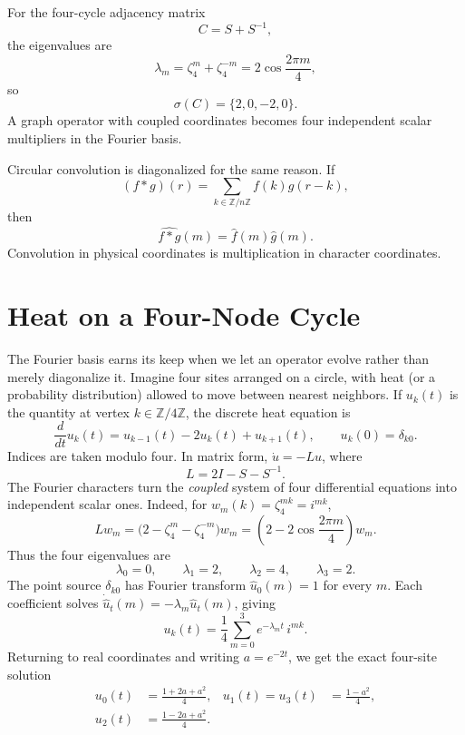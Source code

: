 For the four-cycle adjacency matrix
\[
  C=S+S^{-1},
\]
the eigenvalues are
\[
  \lambda_m
  =\zeta_4^m+\zeta_4^{-m}
  =2\cos\frac{2\pi m}{4},
\]
so
\[
  \sigma(C)=\{2,0,-2,0\}.
\]
A graph operator with coupled coordinates becomes four independent scalar multipliers in the Fourier basis.

Circular convolution is diagonalized for the same reason.  If
\[
  (f*g)(r)=
  \sum_{k\in\mathbb Z/n\mathbb Z}
  f(k)g(r-k),
\]
then
\[
  \widehat{f*g}(m)
  =\widehat f(m)\widehat g(m).
\]
Convolution in physical coordinates is multiplication in character coordinates.

\section{Heat on a Four-Node Cycle}

The Fourier basis earns its keep when we let an operator evolve rather than merely diagonalize it. Imagine four sites arranged on a circle, with heat (or a probability distribution) allowed to move between nearest neighbors. If $u_k(t)$ is the quantity at vertex $k\in\mathbb Z/4\mathbb Z$, the discrete heat equation is
\[
 \frac{d}{dt}u_k(t)=u_{k-1}(t)-2u_k(t)+u_{k+1}(t),
 \qquad u_k(0)=\delta_{k0}.
\]
Indices are taken modulo four. In matrix form, $\dot u=-Lu$, where
\[
 L=2I-S-S^{-1}.
\]
The Fourier characters turn the \emph{coupled} system of four differential equations into independent scalar ones. Indeed, for
$w_m(k)=\zeta_4^{mk}=i^{mk}$,
\[
 Lw_m
 =\bigl(2-\zeta_4^m-\zeta_4^{-m}\bigr)w_m
 =\left(2-2\cos\frac{2\pi m}{4}\right)w_m.
\]
Thus the four eigenvalues are
\[
 \lambda_0=0,\qquad \lambda_1=2,\qquad
 \lambda_2=4,\qquad \lambda_3=2.
\]
The point source $\delta_{k0}$ has Fourier transform $\widehat u_0(m)=1$ for every $m$. Each coefficient solves
$\dot{\widehat u}_t(m)=-\lambda_m\widehat u_t(m)$, giving
\[
 \boxed{u_k(t)=\frac14\sum_{m=0}^3
 e^{-\lambda_m t}\,i^{mk}.}
\]
Returning to real coordinates and writing $a=e^{-2t}$, we get the exact four-site solution
\[
 \begin{aligned}
 u_0(t)&=\frac{1+2a+a^2}{4},&
 u_1(t)=u_3(t)&=\frac{1-a^2}{4},\\
 u_2(t)&=\frac{1-2a+a^2}{4}.&&
 \end{aligned}
\]

